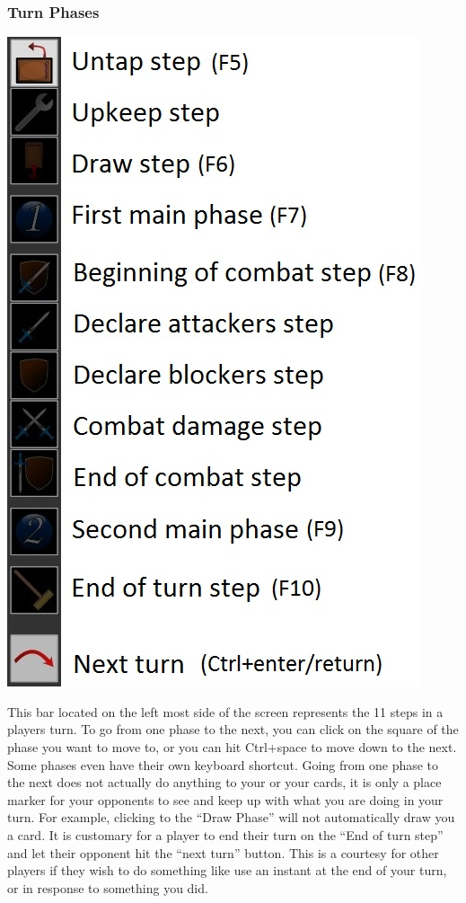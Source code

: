 \documentclass[a4paper]{scrbook}
\begin{document}
\subsubsection{Turn Phases}
\begin{center}
\includegraphics[scale=0.7]{pics/fetchfebd}
\end{center}
This bar located on the left most side of the screen represents the 11 steps in a players turn. To go from one phase to the next, you can click on the square of the phase you want to move to, or you can hit Ctrl+space to move down to the next. Some phases even have their own keyboard shortcut. Going from one phase to the next does not actually do anything to your or your cards, it is only a place marker for your opponents to see and keep up with what you are doing in your turn. For example, clicking to the “Draw Phase” will not automatically draw you a card. It is customary for a player to end their turn on the “End of turn step” and let their opponent hit the “next turn” button. This is a courtesy for other players if they wish to do something like use an instant at the end of your turn, or in response to something you did.
\end{document}
